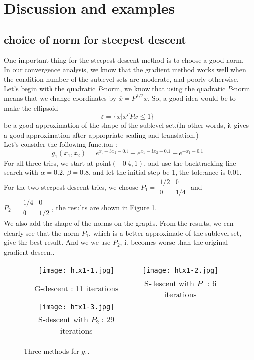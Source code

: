\documentclass{article}
\begin{document}
\section{Discussion and examples}
\subsection{choice of norm for steepest descent}
One important thing for the steepest descent method is to choose a good norm. In our convergence analysis, we know that the gradient method works well when the condition number of the sublevel sets are moderate, and poorly otherwise. Let's begin with the quadratic $P$-norm, we know that using the quadratic $P$-norm means that we change coordinates by $\overline{x} = P^{1/2}x$. So, a good idea would be to make the ellipsoid
\begin{displaymath}
\varepsilon = \{ x | x^TPx \leq 1\}
\end{displaymath}
be a good approximation of the shape of the sublevel set.(In other words, it gives a good approximation after appropriate scaling and translation.) \\
Let's consider the following function :
\begin{displaymath}
g_1(x_1, x_2) = e ^ {x_1 + 3x_2 -0.1} + e ^ {x_1-3x_2-0.1} + e^{-x_1-0.1}
\end{displaymath}
For all three tries, we start at point$(-0.4,1)$, and use the backtracking line search with $\alpha=0.2$, $\beta=0.8$, and let the initial step be 1, the tolerance is 0.01. For the two steepest descent tries, we choose $P_1 = \begin{array}{cc} 1/2 & 0 \\ 0 & 1/4\end{array}$ and
$P_2 = \begin{array}{cc} 1/4 & 0 \\ 0 & 1/2\end{array}$, the results are shown in Figure \ref{fig:htx1}.\\
We also add the shape of the norms on the graphs. From the results, we can clearly see that the norm $P_1$, which is a better
approximate of the sublevel set, give the best result. And we we use $P_2$, it becomes worse than the original gradient descent. \\
\begin{figure}
        \begin{tabular}{cc}
            \texttt{[image: htx1-1.jpg]} &
            \texttt{[image: htx1-2.jpg]} \\
            G-descent : 11 iterations&
            S-descent with $P_1$ : 6 iterations \\
            \texttt{[image: htx1-3.jpg]} \\
            S-descent with $P_2$ : 29 iterations
        \end{tabular}
    \caption{\label{fig:htx1}Three methods for $g_1$.}
\end{figure}
\end{document}
